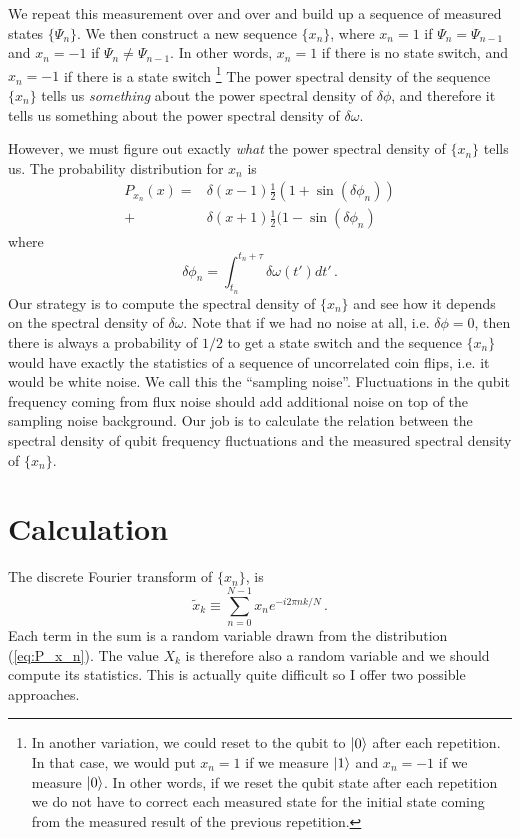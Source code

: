 \documentclass[twocolumn]{article}
\begin{document}
We repeat this measurement over and over and build up a sequence of measured states $\{ \Psi_n \}$.
We then construct a new sequence $\{ x_n \}$, where $x_n=1$ if $\Psi_n = \Psi_{n-1}$ and $x_n = -1$ if $\Psi_n \neq \Psi_{n-1}$.
In other words, $x_n=1$ if there is no state switch, and $x_n = -1$ if there is a state switch \footnote{In another variation, we could reset to the qubit to $| 0 \rangle$ after each repetition. In that case, we would put $x_n=1$ if we measure $| 1 \rangle$ and $x_n=-1$ if we measure $| 0 \rangle$. In other words, if we reset the qubit state after each repetition we do not have to correct each measured state for the initial state coming from the measured result of the previous repetition.}
The power spectral density of the sequence $\{ x_n \}$ tells us \emph{something} about the power spectral density of $\delta \phi$, and therefore it tells us something about the power spectral density of $\delta \omega$.

However, we must figure out exactly \emph{what} the power spectral density of $\{ x_n \}$ tells us.
The probability distribution for $x_n$ is
\begin{align}
P_{x_n}(x) = &
\delta (x - 1) \frac{1}{2}( 1 + \sin(\delta \phi_n)) \nonumber \\
+& \delta (x + 1) \frac{1}{2}( 1 - \sin(\delta \phi_n) \label{eq:P_x_n}
\end{align}
where
\begin{equation}
\delta \phi_n = \int_{t_n}^{t_n + \tau} \delta \omega(t') dt' \, .
\end{equation}
Our strategy is to compute the spectral density of $\{ x_n \}$ and see how it depends on the spectral density of $\delta \omega$.
Note that if we had no noise at all, i.e. $\delta \phi = 0$, then there is always a probability of $1/2$ to get a state switch and the sequence $\{ x_n \}$ would have exactly the statistics of a sequence of uncorrelated coin flips, i.e. it would be white noise.
We call this the ``sampling noise''.
Fluctuations in the qubit frequency coming from flux noise should add additional noise on top of the sampling noise background.
Our job is to calculate the relation between the spectral density of qubit frequency fluctuations and the measured spectral density of $\{ x_n \}$.

\section{Calculation}

The discrete Fourier transform of $\{ x_n \}$, is
\begin{equation}
\tilde{x}_k \equiv \sum_{n=0}^{N-1} x_n e^{-i 2 \pi n k / N} \, . \label{eq:DFT}
\end{equation}
Each term in the sum is a random variable drawn from the distribution (\ref{eq:P_x_n}).
The value $X_k$ is therefore also a random variable and we should compute its statistics.
This is actually quite difficult so I offer two possible approaches.
\end{document}
